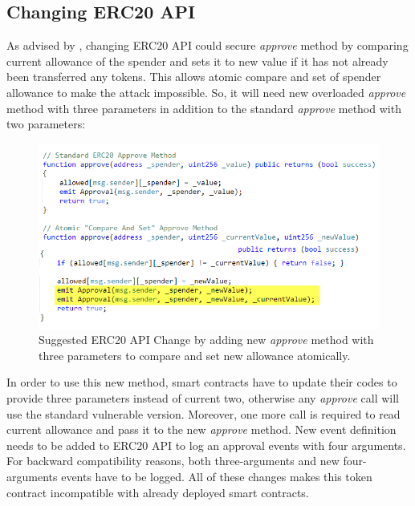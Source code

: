 \subsection{Changing ERC20 API}
As advised by \cite{Ref03}, changing ERC20 API could secure \textit{approve} method by comparing current allowance of the spender and sets it to new value if it has not already been transferred any tokens. This allows atomic compare and set of spender allowance to make the attack impossible. So, it will need new overloaded \textit{approve} method with three parameters in addition to the standard \textit{approve} method with two parameters:
\begin{figure}[t]
	\centering
	\includegraphics[width=1.0\linewidth]{figures/multiple_withdrawal_12.png}
	\caption{Suggested ERC20 API Change by adding new \textit{approve} method with three parameters to compare and set new allowance atomically.}
\end{figure}
\noindent In order to use this new method, smart contracts have to update their codes to provide three parameters instead of current two, otherwise any \textit{approve} call will use the standard vulnerable version. Moreover, one more call is required to read current allowance and pass it to the new \textit{approve} method. New event definition needs to be added to ERC20 API to log an approval events with four arguments. For backward compatibility reasons, both three-arguments and new four-arguments events have to be logged. All of these changes makes this token contract incompatible with already deployed smart contracts.

